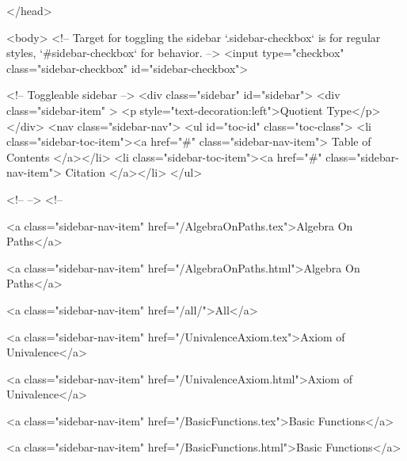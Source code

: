  
</head>




  <body>
    <!-- Target for toggling the sidebar `.sidebar-checkbox` is for regular
     styles, `#sidebar-checkbox` for behavior. -->
<input type="checkbox" class="sidebar-checkbox" id="sidebar-checkbox">

<!-- Toggleable sidebar -->
<div class="sidebar" id="sidebar">
  <div class="sidebar-item" >
    <p style="text-decoration:left">Quotient Type</p>
  </div>
  <nav class="sidebar-nav">
    <ul id="toc-id" class="toc-class">
  <li class="sidebar-toc-item"><a href="#" class="sidebar-nav-item"> Table of Contents </a></li>
  <li class="sidebar-toc-item"><a href="#" class="sidebar-nav-item"> Citation </a></li>
</ul>


    <!--  -->
    <!-- 
      
    
      
    
      
    
      
        
      
    
      
        
          <a class="sidebar-nav-item" href="/AlgebraOnPaths.tex">Algebra On Paths</a>
        
      
    
      
        
          <a class="sidebar-nav-item" href="/AlgebraOnPaths.html">Algebra On Paths</a>
        
      
    
      
        
          <a class="sidebar-nav-item" href="/all/">All</a>
        
      
    
      
        
          <a class="sidebar-nav-item" href="/UnivalenceAxiom.tex">Axiom of Univalence</a>
        
      
    
      
        
          <a class="sidebar-nav-item" href="/UnivalenceAxiom.html">Axiom of Univalence</a>
        
      
    
      
        
          <a class="sidebar-nav-item" href="/BasicFunctions.tex">Basic Functions</a>
        
      
    
      
        
          <a class="sidebar-nav-item" href="/BasicFunctions.html">Basic Functions</a>
        
